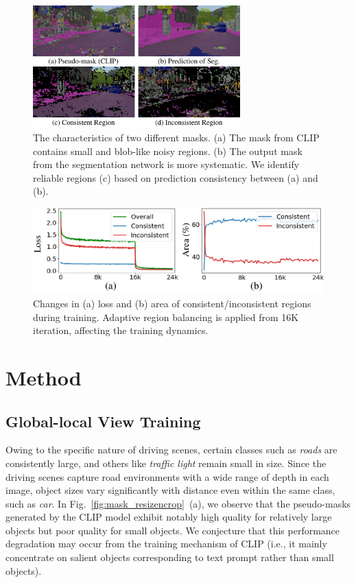\documentclass[letterpaper]{article} %
\def\ie{i.e.} \def\Ie{I.e.}
\begin{document}
\begin{figure}[t]
\begin{center}
\includegraphics[width=8cm]{figures/fig_mask_character.pdf}
\end{center}
\caption{The characteristics of two different masks. (a) The mask from CLIP contains small and blob-like noisy regions. (b) The output mask from the segmentation network is more systematic. We identify reliable regions (c) based on prediction consistency between (a) and (b).}
\label{fig:mask_character}
\end{figure}

\begin{figure}[t]
\begin{center}
\includegraphics[width=\linewidth]{figures/fig_loss1.pdf}
\end{center}
\caption{Changes in (a) loss and (b) area of consistent/inconsistent regions during training. Adaptive region balancing is applied from 16K iteration, affecting the training dynamics.}
\label{fig:fig_loss1}
\end{figure}

\section{Method}

\subsection{Global-local View Training}
Owing to the specific nature of driving scenes, certain classes such as \textit{roads} are consistently large, and others like \textit{traffic light} remain small in size. Since the driving scenes capture road environments with a wide range of depth in each image, object sizes vary significantly with distance even within the same class, such as \textit{car}. In Fig.~\ref{fig:mask_resizencrop}~(a), we observe that the pseudo-masks generated by the CLIP model exhibit notably high quality for relatively large objects but poor quality for small objects. We conjecture that this performance degradation may occur from the training mechanism of CLIP (\ie, it mainly concentrate on salient objects corresponding to text prompt rather than small objects).
\end{document}
